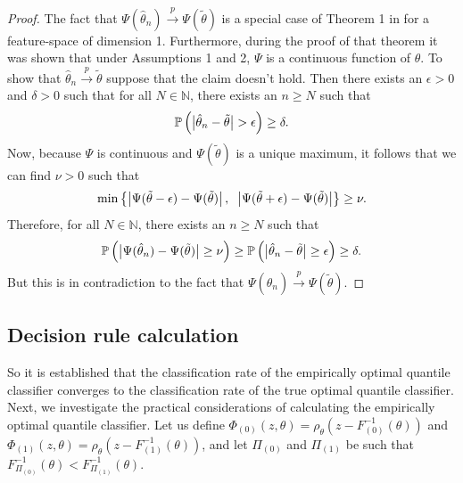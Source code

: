 \begin{proof}
  The fact that
  $\Psi(\hat{\theta}_n) \stackrel{p}{\longrightarrow} \Psi(\tilde{\theta})$ is a
  special case of Theorem 1 in \cite{hennig2016} for a feature-space of
  dimension 1.  Furthermore, during the proof of that theorem it was shown that
  under Assumptions 1 and 2, $\Psi$ is a continuous function of $\theta$.  To
  show that $\hat{\theta}_n \stackrel{p}{\longrightarrow} \tilde{\theta}$
  suppose that the claim doesn't hold.  Then there exists an $\epsilon > 0$ and
  $\delta > 0$ such that for all $N \in \mathbb{N}$, there exists an $n \geq N$
  such that
  \begin{equation*}
    \mathbb{P}\,\Big(
    \big| \hat{\theta}_n - \tilde{\theta} \big|
    > \epsilon \Big)
    \geq \delta.
  \end{equation*}
  Now, because $\Psi$ is continuous and $\Psi(\tilde{\theta})$ is a unique
  maximum, it follows that we can find $\nu > 0$ such that
  \begin{equation*}
    \min \left\{
      \big| \Psi(\Tilde{\theta} - \epsilon) - \Psi(\tilde{\theta}) \big|\,,
      \hspace{2mm}
      \big| \Psi(\Tilde{\theta} + \epsilon) - \Psi(\tilde{\theta}) \big|
    \right\} \geq \nu.
  \end{equation*}
  Therefore, for all $N \in \mathbb{N}$, there exists an $n \geq N$ such that
  \begin{equation*}
    \mathbb{P}\,\Big(
    \big| \Psi(\hat{\theta}_n) - \Psi(\tilde{\theta}) \big|
    \geq \nu \Big) \geq
    \mathbb{P}\,\Big(
    \big| \hat{\theta}_n - \tilde{\theta} \big|
    \geq \epsilon \Big)
    \geq \delta.
  \end{equation*}
  But this is in contradiction to the fact that
  $\Psi(\hat{\theta}_n) \stackrel{p}{\longrightarrow} \Psi(\tilde{\theta})$.
\end{proof}




\subsection{Decision rule calculation}
\label{sec:empirical-quantile-classifier-results}

So it is established that the classification rate of the empirically optimal
quantile classifier converges to the classification rate of the true optimal
quantile classifier.  Next, we investigate the practical considerations of
calculating the empirically optimal quantile classifier.  Let us define
$\Phi_{(0)}(z, \theta) = \rho_{\theta}\left(z - F_{(0)}^{-1}(\theta)\right)$ and
$\Phi_{(1)}(z, \theta) = \rho_{\theta}\left(z - F_{(1)}^{-1}(\theta)\right)$,
and let $\Pi_{(0)}$ and $\Pi_{(1)}$ be such that
$F_{\Pi_{(0)}}^{-1}(\theta) < F_{\Pi_{(1)}}^{-1}(\theta)$.

